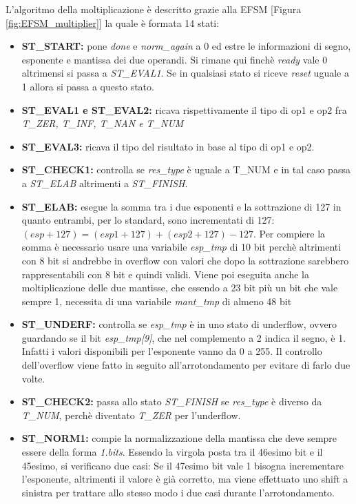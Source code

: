 \documentclass[]{IEEEtran}
\begin{document}
L'algoritmo della moltiplicazione è descritto grazie alla EFSM [Figura \ref{fig:EFSM_multiplier}] la quale è formata 14 stati:
\begin{itemize}
    \item \textbf{ST\_START:} pone \textit{done} e \textit{norm\_again} a 0 ed estre le informazioni di segno, esponente e mantissa dei due operandi. Si rimane qui finchè \textit{ready} vale 0 altrimensi si passa a \textit{ST\_EVAL1}. Se in qualsiasi stato si riceve \textit{reset} uguale a 1 allora si passa a questo stato.
    \item \textbf{ST\_EVAL1 e ST\_EVAL2:} ricava rispettivamente il tipo di op1 e op2 fra \textit{T\_ZER, T\_INF, T\_NAN e T\_NUM}
    \item \textbf{ST\_EVAL3:} ricava il tipo del risultato in base al tipo di op1 e op2.
    \item \textbf{ST\_CHECK1:} controlla se \textit{res\_type} è uguale a T\_NUM e in tal caso passa a \textit{ST\_ELAB} altrimenti a \textit{ST\_FINISH}.
    \item \textbf{ST\_ELAB:} esegue la somma tra i due esponenti e la sottrazione di 127 in quanto entrambi, per lo standard, sono incrementati di 127: $(esp+127) = (esp1+127)+(esp2+127)-127$. Per compiere la somma è necessario usare una variabile \textit{esp\_tmp} di 10 bit perchè altrimenti con 8 bit si andrebbe in overflow con valori che dopo la sottrazione sarebbero rappresentabili con 8 bit e quindi validi. Viene poi eseguita anche la moltiplicazione delle due mantisse, che essendo a 23 bit più un bit che vale sempre 1, necessita di una variabile \textit{mant\_tmp} di almeno 48 bit
    \item \textbf{ST\_UNDERF:} controlla se \textit{esp\_tmp} è in uno stato di underflow, ovvero guardando se il bit \textit{esp\_tmp[9]}, che nel complemento a 2 indica il segno, è 1. Infatti i valori disponibili per l'esponente vanno da 0 a 255. Il controllo dell'overflow viene fatto in seguito all'arrotondamento per evitare di farlo due volte.
    \item \textbf{ST\_CHECK2:} passa allo stato \textit{ST\_FINISH} se \textit{res\_type} è diverso da \textit{T\_NUM}, perchè diventato \textit{T\_ZER} per l'underflow.
    \item \textbf{ST\_NORM1:} compie la normalizzazione della mantissa che deve sempre essere della forma \textit{1.bits}. Essendo la virgola posta tra il 46esimo bit e il 45esimo, si verificano due casi: Se il 47esimo bit vale 1 bisogna incrementare l'esponente, altrimenti il valore è già corretto, ma viene effettuato uno shift a sinistra per trattare allo stesso modo i due casi durante l'arrotondamento.

\end{itemize}
\end{document}
